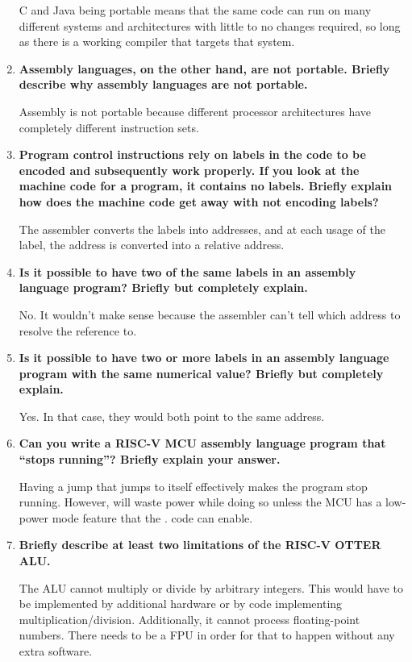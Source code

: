 \documentclass{article}
\begin{document}
\begin{enumerate}
    C and Java being portable means that the same code can run on many different systems and architectures with 
    little to no changes required, so long as there is a working compiler that targets that system.
    \item \textbf{Assembly languages, on the other hand, are not portable. Briefly describe why assembly
    languages are not portable.  }
    
    Assembly is not portable because different processor architectures 
        have completely different instruction sets.
    \item \textbf{Program control instructions rely on labels in the code to be encoded and subsequently work
    properly. If you look at the machine code for a program, it contains no labels. Briefly explain how
    does the machine code get away with not encoding labels?  }
    
    The assembler converts the labels into addresses, and at each 
        usage of the label, the address is converted into a relative address.
    \item \textbf{Is it possible to have two of the same labels in an assembly language program? Briefly but
    completely explain.  } 
    
    No. It wouldn't make sense because the assembler can't tell which
        address to resolve the reference to. 
    \item \textbf{Is it possible to have two or more labels in an assembly language program with the same
    numerical value? Briefly but completely explain.  } 

    Yes. In that case, they would both point to the same address. 
    \item \textbf{Can you write a RISC-V MCU assembly language program that “stops running”? Briefly explain
    your answer.  }
    
    Having a jump that jumps to itself effectively makes the program stop running. However, 
    will waste power while doing so unless the MCU has a low-power mode feature that the .
    code can enable.
    \item \textbf{Briefly describe at least two limitations of the RISC-V OTTER ALU. }
    
    The ALU cannot multiply or divide by arbitrary integers. This would
        have to be implemented by additional hardware or by code implementing
        multiplication/division. Additionally, it cannot process floating-point 
        numbers. There needs to be a FPU in order for that to happen without any 
        extra software.
\end{enumerate}
\end{document}
